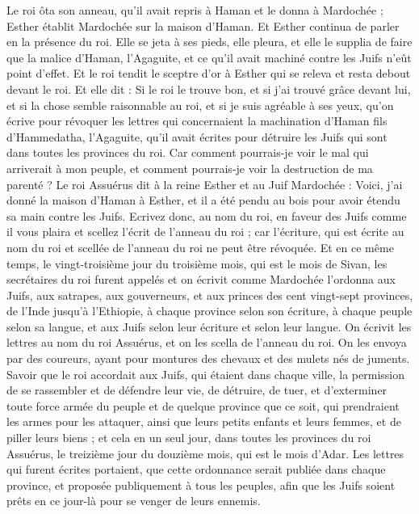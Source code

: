 \begin{multicols}{2}
Le roi ôta son anneau, qu'il avait repris à Haman et le donna à Mardochée ; Esther établit Mardochée sur la maison d'Haman.
Et Esther continua de parler en la présence du roi. Elle se jeta à ses pieds, elle pleura, et elle le supplia de faire que la malice d'Haman, l'Agaguite, et ce qu'il avait machiné contre les Juifs n'eût point d'effet.
Et le roi tendit le sceptre d'or à Esther qui se releva et resta debout devant le roi.
Et elle dit : Si le roi le trouve bon, et si j'ai trouvé grâce devant lui, et si la chose semble raisonnable au roi, et si je suis agréable à ses yeux, qu'on écrive pour révoquer les lettres qui concernaient la machination d'Haman fils d'Hammedatha, l'Agaguite, qu'il avait écrites pour détruire les Juifs qui sont dans toutes les provinces du roi.
Car comment pourrais-je voir le mal qui arriverait à mon peuple, et comment pourrais-je voir la destruction de ma parenté ?
Le roi Assuérus dit à la reine Esther et au Juif Mardochée : Voici, j'ai donné la maison d'Haman à Esther, et il a été pendu au bois pour avoir étendu sa main contre les Juifs.
Ecrivez donc, au nom du roi, en faveur des Juifs comme il vous plaira et scellez l'écrit de l'anneau du roi ; car l'écriture, qui est écrite au nom du roi et scellée de l'anneau du roi ne peut être révoquée.
Et en ce même temps, le vingt-troisième jour du troisième mois, qui est le mois de Sivan, les secrétaires du roi furent appelés et on écrivit comme Mardochée l'ordonna aux Juifs, aux satrapes, aux gouverneurs, et aux princes des cent vingt-sept provinces, de l'Inde jusqu'à l'Ethiopie, à chaque province selon son écriture, à chaque peuple selon sa langue, et aux Juifs selon leur écriture et selon leur langue.
On écrivit les lettres au nom du roi Assuérus, et on les scella de l'anneau du roi. On les envoya par des coureurs, ayant pour montures des chevaux et des mulets nés de juments.
Savoir que le roi accordait aux Juifs, qui étaient dans chaque ville, la permission de se rassembler et de défendre leur vie, de détruire, de tuer, et d'exterminer toute force armée du peuple et de quelque province que ce soit, qui prendraient les armes pour les attaquer, ainsi que leurs petits enfants et leurs femmes, et de piller leurs biens ;
et cela en un seul jour, dans toutes les provinces du roi Assuérus, le treizième jour du douzième mois, qui est le mois d'Adar.
Les lettres qui furent écrites portaient, que cette ordonnance serait publiée dans chaque province, et proposée publiquement à tous les peuples, afin que les Juifs soient prêts en ce jour-là pour se venger de leurs ennemis.

\end{multicols}
